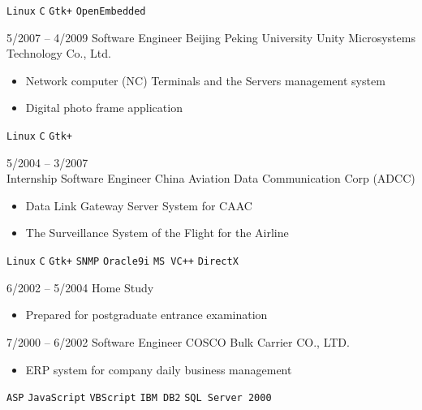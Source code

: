 \documentclass[9pt]{developercv} %
\begin{document}
\begin{entrylist}
{\begin{itemize}[noitemsep,topsep=0pt,parsep=0pt,partopsep=0pt, leftmargin=-1pt]
        \end{itemize} 
        \texttt{Linux} \slashsep \texttt{C} \slashsep \texttt{Gtk+} \slashsep \texttt{OpenEmbedded}}
	\entry
		{5/2007 -- 4/2009}
		{Software Engineer}
		{Beijing Peking University Unity Microsystems Technology Co., Ltd.}
		{\vspace{-10pt}
        \begin{itemize}[noitemsep,topsep=0pt,parsep=0pt,partopsep=0pt, leftmargin=-1pt]
            \item Network computer (NC) Terminals and the Servers management system
            \item Digital photo frame application
        \end{itemize} 
        \texttt{Linux} \slashsep \texttt{C} \slashsep \texttt{Gtk+}}
	\entry
		{5/2004 -- 3/2007 \\\footnotesize{Internship}}
		{Software Engineer}
		{China Aviation Data Communication Corp (ADCC)}
		{\vspace{-10pt}
        \begin{itemize}[noitemsep,topsep=0pt,parsep=0pt,partopsep=0pt, leftmargin=-1pt]
            \item Data Link Gateway Server System for CAAC
            \item The Surveillance System of the Flight for the Airline
        \end{itemize}
        \texttt{Linux} \slashsep \texttt{C} \slashsep \texttt{Gtk+} \slashsep \texttt{SNMP} \slashsep \texttt{Oracle9i} \slashsep \texttt{MS VC++} \slashsep \texttt{DirectX}}
	\entry
		{6/2002 -- 5/2004}
		{Home Study}
		{}
		{\vspace{-10pt}
        \begin{itemize}[noitemsep,topsep=0pt,parsep=0pt,partopsep=0pt, leftmargin=-1pt]
            \item Prepared for postgraduate entrance examination
        \end{itemize}
        }
    \entry
		{7/2000 -- 6/2002}
		{Software Engineer}
		{COSCO Bulk Carrier CO., LTD.}
		{\vspace{-10pt}
        \begin{itemize}[noitemsep,topsep=0pt,parsep=0pt,partopsep=0pt, leftmargin=-1pt]
            \item ERP system for company daily business management
        \end{itemize}
        \texttt{ASP} \slashsep \texttt{JavaScript} \slashsep \texttt{VBScript} \slashsep \texttt{IBM DB2} \slashsep \texttt{SQL Server 2000}}
\end{entrylist}
\end{document}
